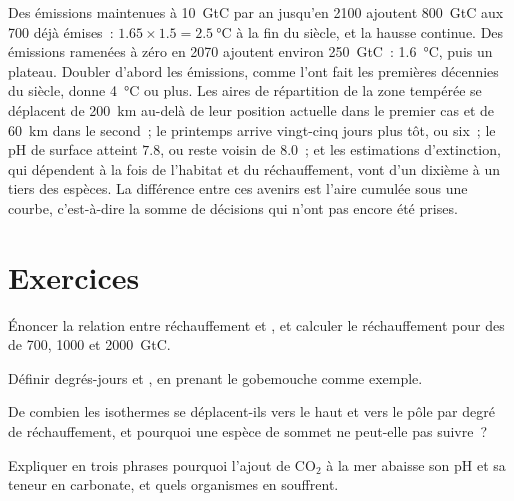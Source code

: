 \begin{example}\label{ex:b2:global-change:scenarios}
Des émissions maintenues à \qty{10}{GtC} par an jusqu'en 2100 ajoutent
\qty{800}{GtC} aux \qty{700}{} déjà émises~: $1.65\times 1.5 =
\qty{2.5}{\celsius}$ à la fin du siècle, et la hausse continue. Des
émissions ramenées à zéro en 2070 ajoutent environ \qty{250}{GtC}~:
\qty{1.6}{\celsius}, puis un plateau. Doubler d'abord les émissions, comme
l'ont fait les premières décennies du siècle, donne \qty{4}{\celsius} ou
plus. Les aires de répartition de la zone tempérée se déplacent de
\qty{200}{km} au-delà de leur position actuelle dans le premier cas et
de \qty{60}{km} dans le second~; le printemps arrive vingt-cinq jours
plus tôt, ou six~; le pH de surface atteint $7.8$, ou reste voisin de
$8.0$~; et les estimations d'extinction, qui dépendent à la fois de
l'habitat et du réchauffement, vont d'un dixième à un tiers des espèces.
La différence entre ces avenirs est l'aire cumulée sous une courbe,
c'est-à-dire la somme de décisions qui n'ont pas encore été prises.
\end{example}

\section{Exercices}

\begin{exercise}[$\star$]\label{exo:b2:global-change:1}
Énoncer la relation entre réchauffement et , et
calculer le réchauffement pour des  de 700, 1000 et
\qty{2000}{GtC}.
\end{exercise}

\begin{exercise}[$\star$]\label{exo:b2:global-change:2}
Définir degrés-jours et , en prenant le gobemouche
comme exemple.
\end{exercise}

\begin{exercise}[$\star$]\label{exo:b2:global-change:3}
De combien les isothermes se déplacent-ils vers le haut et vers le pôle
par degré de réchauffement, et pourquoi une espèce de sommet ne peut-elle
pas suivre~?
\end{exercise}

\begin{exercise}[$\star$]\label{exo:b2:global-change:4}
Expliquer en trois phrases pourquoi l'ajout de \ensuremath{\mathrm{CO_2}} à la mer abaisse
son pH et sa teneur en carbonate, et quels organismes en souffrent.
\end{exercise}


